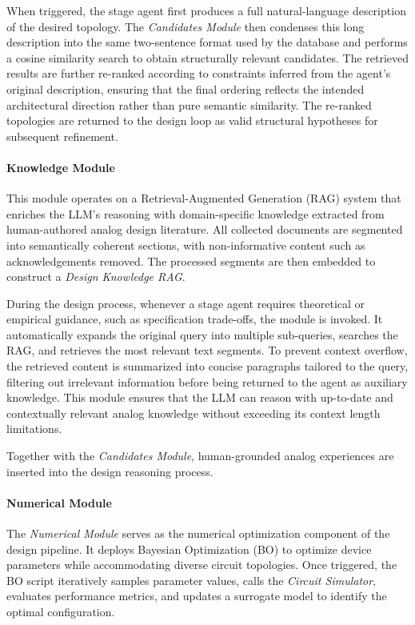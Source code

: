 \documentclass[sigconf,nonacm]{acmart}
\begin{document}
When triggered, the stage agent first produces a full natural-language description of the desired topology. The \emph{Candidates Module} then condenses this long description into the same two-sentence format used by the database and performs a cosine similarity search to obtain structurally relevant candidates. The retrieved results are further re-ranked according to constraints inferred from the agent’s original description, ensuring that the final ordering reflects the intended architectural direction rather than pure semantic similarity. The re-ranked topologies are returned to the design loop as valid structural hypotheses for subsequent refinement.



\paragraph{Knowledge Module}

This module operates on a Retrieval-Augmented Generation (RAG) system that enriches the LLM's reasoning with domain-specific knowledge extracted from human-authored analog design literature. All collected documents are segmented into semantically coherent sections, with non-informative content such as acknowledgements removed. The processed segments are then embedded to construct a \emph{Design Knowledge RAG}.

During the design process, whenever a stage agent requires theoretical or empirical guidance, such as specification trade-offs, the module is invoked. It automatically expands the original query into multiple sub-queries, searches the RAG, and retrieves the most relevant text segments. To prevent context overflow, the retrieved content is summarized into concise paragraphs tailored to the query, filtering out irrelevant information before being returned to the agent as auxiliary knowledge. This module ensures that the LLM can reason with up-to-date and contextually relevant analog knowledge without exceeding its context length limitations.

Together with the \emph{Candidates Module},  human-grounded analog experiences are inserted into the design reasoning process.




\paragraph{Numerical Module}

The \emph{Numerical Module} serves as the numerical optimization component of the design pipeline. It deploys Bayesian Optimization (BO) to optimize device parameters while accommodating diverse circuit topologies. Once triggered, the BO script iteratively samples parameter values, calls the \emph{Circuit Simulator}, evaluates performance metrics, and updates a surrogate model to identify the optimal configuration.
\end{document}
